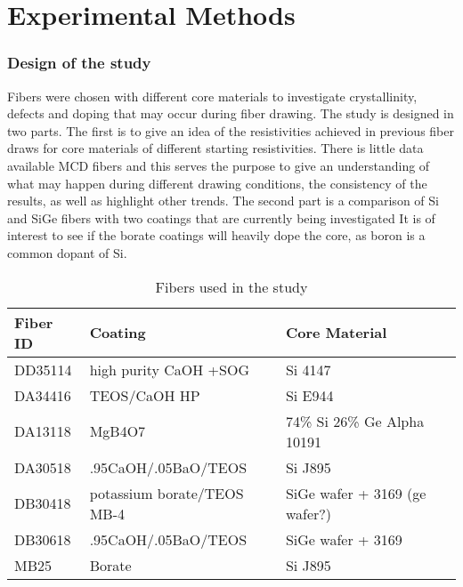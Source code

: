 \chapter{Experimental Methods}
\subsection{Design of the study}
Fibers were chosen with different core materials to investigate crystallinity, defects and doping that may occur during fiber drawing. The study is designed in two parts. The first is to give an idea of the resistivities achieved in previous fiber draws for core materials of different starting resistivities. There is little data available MCD fibers and this serves the purpose to give an understanding of what may happen during different drawing conditions, the consistency of the results, as well as highlight other trends. The second part is a comparison of Si and SiGe fibers with two coatings  that are currently being investigated %
It is of interest to see if the borate coatings will heavily dope the core, as boron is a common dopant of Si. 

 \begin{table}[h]
\begin{center}
    \begin{tabular}{|l|l|l|l|  }
    \hline
    \textbf{Fiber ID} & \textbf{Coating} & \textbf{Core Material}   \\ \hline
    
      DD35114 & high purity CaOH +SOG & Si 4147 \\
      DA34416 & TEOS/CaOH HP & Si E944 \\
      DA13118 & MgB4O7 & 74\% Si 26\% \newline Ge Alpha 10191 \\
      DA30518 & .95CaOH/.05BaO/TEOS & Si J895  \\ 
      DB30418 & potassium borate/TEOS MB-4 & SiGe wafer \newline+ 3169 (ge wafer?)    \\ 
      DB30618 & .95CaOH/.05BaO/TEOS & SiGe wafer \newline + 3169   \\ 
      MB25 & Borate & Si J895  \\
      
     \hline
    \end{tabular}
\end{center}
\caption{Fibers used in the study}
\label{Tab1}
\end{table}


